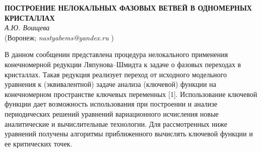 \begin{center}{ \bf  ПОСТРОЕНИЕ НЕЛОКАЛЬНЫХ ФАЗОВЫХ ВЕТВЕЙ В ОДНОМЕРНЫХ КРИСТАЛЛАХ}\\
{\it А.Ю. Воищева} \\
(Воронеж; {\it nastyabems@yandex.ru} )
\end{center}

В данном сообщении представлена процедура нелокального применения
конечномерной редукции Ляпунова--Шми\-д\-та к задаче о фазовых
переходах в кристаллах. Такая редукция реализует переход от
исходного модельного уравнения к (эквивалентной) задаче анализа
(ключевой) функции на конечномерном пространстве ключевых переменных
[1]. Использование ключевой функции дает возможность использования
при построении и анализе периодических решений уравнений
вариационного исчисления новые аналитические и вычислительные
технологии. Для рассмотренных ниже уравнений получены алгоритмы
приближенного вычислять ключевой функции и ее критических точек.


